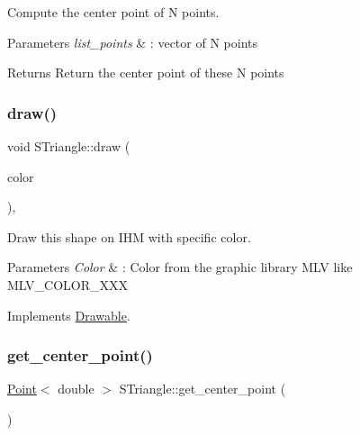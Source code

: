 Compute the center point of N points. 


\begin{DoxyParams}{Parameters}
{\em list\+\_\+points} & \+: vector of N points \\
\hline
\end{DoxyParams}
\begin{DoxyReturn}{Returns}
Return the center point of these N points 
\end{DoxyReturn}
\mbox{\label{classSTriangle_a52f6b3c69067f90821cae1d378d1e575}} 
\subsubsection{\texorpdfstring{draw()}{draw()}}
{\footnotesize\ttfamily void S\+Triangle\+::draw (\begin{DoxyParamCaption}\item[{M\+L\+V\+\_\+\+Color}]{color }\end{DoxyParamCaption})\hspace{0.3cm}{\ttfamily [override]}, {\ttfamily [virtual]}}



Draw this shape on I\+HM with specific color. 


\begin{DoxyParams}{Parameters}
{\em Color} & \+: Color from the graphic library M\+LV like M\+L\+V\+\_\+\+C\+O\+L\+O\+R\+\_\+\+X\+XX \\
\hline
\end{DoxyParams}


Implements \hyperlink{classDrawable}{Drawable}.

\mbox{\label{classSTriangle_a61228a7f80ee90de80dff8c4e046f51f}} 
\subsubsection{\texorpdfstring{get\+\_\+center\+\_\+point()}{get\_center\_point()}}
{\footnotesize\ttfamily \hyperlink{classPoint}{Point}$<$ double $>$ S\+Triangle\+::get\+\_\+center\+\_\+point (\begin{DoxyParamCaption}{ }\end{DoxyParamCaption})}



